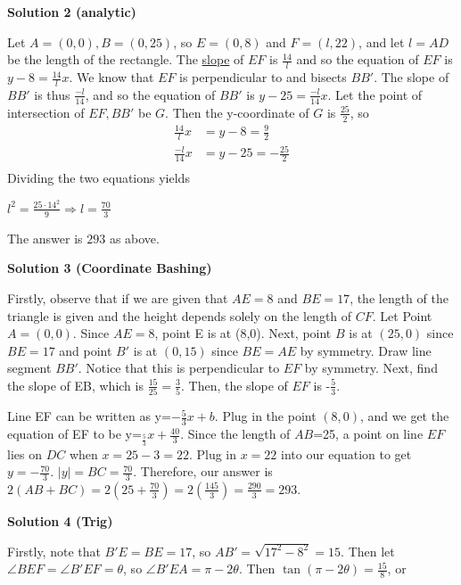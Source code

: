\begin{enumerate}
 



\textbf{Solution 2 (analytic)}

Let $A = (0,0), B=(0,25)$, so $E = (0,8)$ and $F = (l,22)$, and let $l = AD$ be the length of the rectangle. The \href{https://artofproblemsolving.com/wiki/index.php?title=Slope}{slope} of $EF$ is $\frac{14}{l}$ and so the equation of $EF$ is $y -8 = \frac{14}{l}x$. We know that $EF$ is perpendicular to and bisects $BB'$. The slope of $BB'$ is thus $\frac{-l}{14}$, and so the equation of $BB'$ is $y -25 = \frac{-l}{14}x$. Let the point of intersection of $EF, BB'$ be $G$. Then the y-coordinate of $G$ is $\frac{25}{2}$, so
 \begin{align*} \frac{14}{l}x &= y-8 = \frac{9}{2}\\ \frac{-l}{14}x &= y-25 = -\frac{25}{2}\\ \end{align*}
Dividing the two equations yields

 $l^2 = \frac{25 \cdot 14^2}{9} \Longrightarrow l = \frac{70}{3}$

 The answer is $\boxed{293}$ as above.

 



\textbf{Solution 3 (Coordinate Bashing)}

Firstly, observe that if we are given that $AE=8$ and $BE=17$, the length of the triangle is given and the height depends solely on the length of $CF$. Let Point $A = (0,0)$. Since $AE=8$, point E is at (8,0). Next, point $B$ is at $(25,0)$ since $BE=17$ and point $B'$ is at $(0,15)$ since $BE=AE$ by symmetry. Draw line segment $BB'$. Notice that this is perpendicular to $EF$ by symmetry. Next, find the slope of EB, which is $\frac{15}{25}=\frac{3}{5}$. Then, the slope of $EF$ is -$\frac{5}{3}$. 

 Line EF can be written as y=$-\frac{5}{3}x+b$. Plug in the point $(8,0)$, and we get the equation of EF to be y=$_\frac{5}{3}x+\frac{40}{3}$. Since the length of $AB$=25, a point on line $EF$ lies on $DC$ when $x=25-3=22$. Plug in $x=22$ into our equation to get $y=-\frac{70}{3}$. $|y|=BC=\frac{70}{3}$. Therefore, our answer is $2(AB+BC)=2\left(25+\frac{70}{3}\right)=2\left(\frac{145}{3}\right)=\frac{290}{3}= \boxed{293}$.

 



\textbf{Solution 4 (Trig)}

Firstly, note that $B'E=BE=17$, so $AB'=\sqrt{17^2-8^2}=15$. Then let $\angle BEF=\angle B'EF=\theta$, so $\angle B'EA = \pi-2\theta$. Then $\tan(\pi-2\theta)=\frac{15}{8}$, or 


\end{enumerate}
